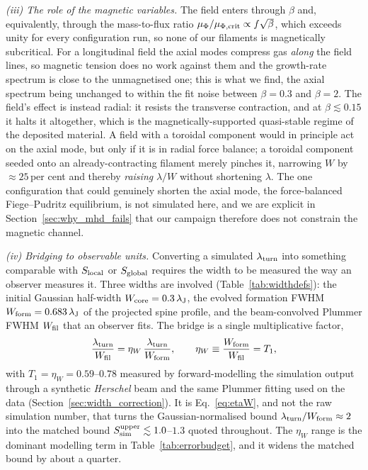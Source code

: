 \documentclass[usenatbib,twoside,twocolumn]{mnras}
\begin{document}
\smallskip\noindent\emph{(iii) The role of the magnetic variables.} The field enters through $\beta$ and, equivalently, through the mass-to-flux ratio $\mu_\Phi/\mu_{\Phi,\rm crit}\propto f\sqrt{\beta}$, which exceeds unity for every configuration run, so none of our filaments is magnetically subcritical. For a longitudinal field the axial modes compress gas \emph{along} the field lines, so magnetic tension does no work against them and the growth-rate spectrum is close to the unmagnetised one; this is what we find, the axial spectrum being unchanged to within the fit noise between $\beta=0.3$ and $\beta=2$. The field's effect is instead radial: it resists the transverse contraction, and at $\beta\lesssim0.15$ it halts it altogether, which is the magnetically-supported quasi-stable regime of the deposited material. A field with a toroidal component would in principle act on the axial mode, but only if it is in radial force balance; a toroidal component seeded onto an already-contracting filament merely pinches it, narrowing $W$ by $\approx25$\,per cent and thereby \emph{raising} $\lambda/W$ without shortening $\lambda$. The one configuration that could genuinely shorten the axial mode, the force-balanced Fiege--Pudritz equilibrium, is not simulated here, and we are explicit in Section~\ref{sec:why_mhd_fails} that our campaign therefore does not constrain the magnetic channel.

\smallskip\noindent\emph{(iv) Bridging to observable units.} Converting a simulated $\lambda_{\rm turn}$ into something comparable with $S_{\rm local}$ or $S_{\rm global}$ requires the width to be measured the way an observer measures it. Three widths are involved (Table~\ref{tab:widthdefs}): the initial Gaussian half-width $W_{\rm core}=0.3\,\lambda_{\rm J}$, the evolved formation FWHM $W_{\rm form}=0.683\,\lambda_{\rm J}$ of the projected spine profile, and the beam-convolved Plummer FWHM $W_{\rm fil}$ that an observer fits. The bridge is a single multiplicative factor,
\begin{equation}
\frac{\lambda_{\rm turn}}{W_{\rm fil}}=\eta_W\,\frac{\lambda_{\rm turn}}{W_{\rm form}},
\qquad \eta_W\equiv\frac{W_{\rm form}}{W_{\rm fil}}=T_1,
\label{eq:etaW}
\end{equation}
with $T_1=\eta_W=0.59$--$0.78$ measured by forward-modelling the simulation output through a synthetic \textit{Herschel} beam and the same Plummer fitting used on the data (Section~\ref{sec:width_correction}). It is Eq.~\ref{eq:etaW}, and not the raw simulation number, that turns the Gaussian-normalised bound $\lambda_{\rm turn}/W_{\rm form}\approx2$ into the matched bound $S_{\rm sim}^{\rm upper}\lesssim1.0$--$1.3$ quoted throughout. The $\eta_W$ range is the dominant modelling term in Table~\ref{tab:errorbudget}, and it widens the matched bound by about a quarter.
\end{document}
